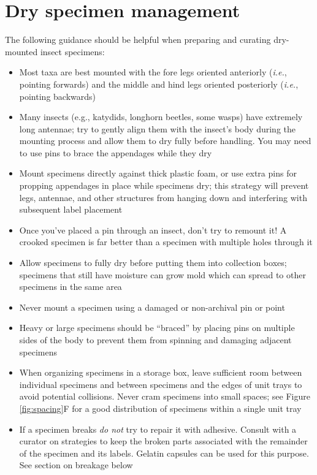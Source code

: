 \section{Dry specimen management}\label{DrySpecimenManagement}
\noindent{}The following guidance should be helpful when preparing and curating dry-mounted insect specimens:
\begin{itemize}
    \item Most taxa are best mounted with the fore legs oriented anteriorly (\textit{i.e.}, pointing forwards) and the middle and hind legs oriented posteriorly (\textit{i.e.}, pointing backwards)
    \item Many insects (e.g., katydids, longhorn beetles, some wasps) have extremely long antennae; try to gently align them with the insect's body during the mounting process and allow them to dry fully before handling. You may need to use pins to brace the appendages while they dry
    \item Mount specimens directly against thick plastic foam, or use extra pins for propping appendages in place while specimens dry; this strategy will prevent legs, antennae, and other structures from hanging down and interfering with subsequent label placement
    \item Once you've placed a pin through an insect, don't try to remount it! A crooked specimen is far better than a specimen with multiple holes through it
    \item Allow specimens to fully dry before putting them into collection boxes; specimens that still have moisture can grow mold which can spread to other specimens in the same area
    \item Never mount a specimen using a damaged or non-archival pin or point
    \item Heavy or large specimens should be ``braced'' by placing pins on multiple sides of the body to prevent them from spinning and damaging adjacent specimens
    \item When organizing specimens in a storage box, leave sufficient room between individual specimens and between specimens and the edges of unit trays to avoid potential collisions. Never cram specimens into small spaces; see Figure \ref{fig:spacing}F for a good distribution of specimens within a single unit tray
    \item If a specimen breaks \textit{do not} try to repair it with adhesive. Consult with a curator on strategies to keep the broken parts associated with the remainder of the specimen and its labels. Gelatin capsules can be used for this purpose. See section on breakage below
\end{itemize}

